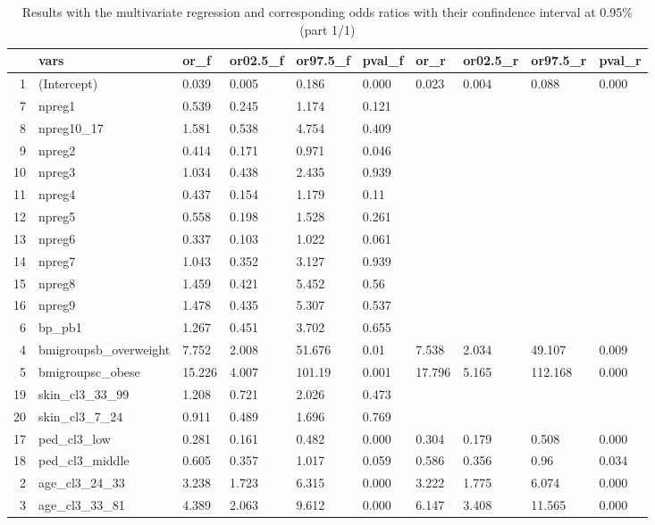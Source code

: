 \documentclass[12pt]{article}
\begin{document}
\newpage
\begin{table}[ht]
\centering
\begin{tabular}{rlllllllll}
  \hline
 & vars & or\_f & or02.5\_f & or97.5\_f & pval\_f & or\_r & or02.5\_r & or97.5\_r & pval\_r \\ 
  \hline
1 & (Intercept) & 0.039 & 0.005 & 0.186 & 0.000 & 0.023 & 0.004 & 0.088 & 0.000 \\ 
  7 & npreg1 & 0.539 & 0.245 & 1.174 & 0.121 &   &   &   &   \\ 
  8 & npreg10\_17 & 1.581 & 0.538 & 4.754 & 0.409 &   &   &   &   \\ 
  9 & npreg2 & 0.414 & 0.171 & 0.971 & 0.046 &   &   &   &   \\ 
  10 & npreg3 & 1.034 & 0.438 & 2.435 & 0.939 &   &   &   &   \\ 
  11 & npreg4 & 0.437 & 0.154 & 1.179 & 0.11 &   &   &   &   \\ 
  12 & npreg5 & 0.558 & 0.198 & 1.528 & 0.261 &   &   &   &   \\ 
  13 & npreg6 & 0.337 & 0.103 & 1.022 & 0.061 &   &   &   &   \\ 
  14 & npreg7 & 1.043 & 0.352 & 3.127 & 0.939 &   &   &   &   \\ 
  15 & npreg8 & 1.459 & 0.421 & 5.452 & 0.56 &   &   &   &   \\ 
  16 & npreg9 & 1.478 & 0.435 & 5.307 & 0.537 &   &   &   &   \\ 
  6 & bp\_pb1 & 1.267 & 0.451 & 3.702 & 0.655 &   &   &   &   \\ 
  4 & bmigroupsb\_overweight & 7.752 & 2.008 & 51.676 & 0.01 & 7.538 & 2.034 & 49.107 & 0.009 \\ 
  5 & bmigroupsc\_obese & 15.226 & 4.007 & 101.19 & 0.001 & 17.796 & 5.165 & 112.168 & 0.000 \\ 
  19 & skin\_cl3\_33\_99 & 1.208 & 0.721 & 2.026 & 0.473 &   &   &   &   \\ 
  20 & skin\_cl3\_7\_24 & 0.911 & 0.489 & 1.696 & 0.769 &   &   &   &   \\ 
  17 & ped\_cl3\_low & 0.281 & 0.161 & 0.482 & 0.000 & 0.304 & 0.179 & 0.508 & 0.000 \\ 
  18 & ped\_cl3\_middle & 0.605 & 0.357 & 1.017 & 0.059 & 0.586 & 0.356 & 0.96 & 0.034 \\ 
  2 & age\_cl3\_24\_33 & 3.238 & 1.723 & 6.315 & 0.000 & 3.222 & 1.775 & 6.074 & 0.000 \\ 
  3 & age\_cl3\_33\_81 & 4.389 & 2.063 & 9.612 & 0.000 & 6.147 & 3.408 & 11.565 & 0.000 \\ 
   \hline
\end{tabular}
\caption{Results with the multivariate regression and corresponding odds ratios with their confindence interval at 0.95\% (part 1/1)} 
\label{tab:or.from.reglogistic.1}
\end{table}
 
\end{document}

